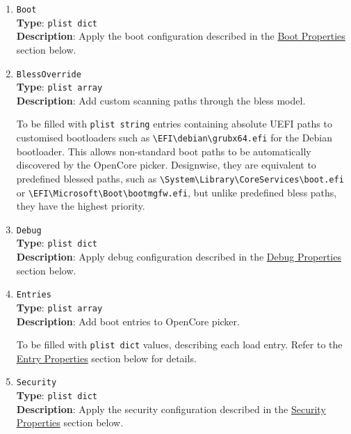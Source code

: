 \documentclass[]{article}
\begin{document}
\begin{enumerate}
\item
  \texttt{Boot}\\
  \textbf{Type}: \texttt{plist\ dict}\\
  \textbf{Description}: Apply the boot configuration described in the
  \hyperref[miscbootprops]{Boot Properties} section below.

\item
  \texttt{BlessOverride}\\
  \textbf{Type}: \texttt{plist\ array}\\
  \textbf{Description}: Add custom scanning paths through the bless model.

  To be filled with \texttt{plist\ string} entries containing
  absolute UEFI paths to customised bootloaders such as
  \texttt{\textbackslash EFI\textbackslash debian\textbackslash grubx64.efi}
  for the Debian bootloader. This allows non-standard boot paths to be automatically
  discovered by the OpenCore picker. Designwise, they are equivalent to predefined blessed paths, such as
  \texttt{\textbackslash System\textbackslash Library\textbackslash CoreServices\textbackslash boot.efi}
  or \texttt{\textbackslash EFI\textbackslash Microsoft\textbackslash Boot\textbackslash bootmgfw.efi},
  but unlike predefined bless paths, they have the highest priority.

\item
  \texttt{Debug}\\
  \textbf{Type}: \texttt{plist\ dict}\\
  \textbf{Description}: Apply debug configuration described in the
  \hyperref[miscdebugprops]{Debug Properties} section below.

\item
  \texttt{Entries}\\
  \textbf{Type}: \texttt{plist\ array}\\
  \textbf{Description}: Add boot entries to OpenCore picker.

  To be filled with \texttt{plist\ dict} values, describing each load entry.
  Refer to the \hyperref[miscentryprops]{Entry Properties} section below for details.

\item
  \texttt{Security}\\
  \textbf{Type}: \texttt{plist\ dict}\\
  \textbf{Description}: Apply the security configuration described in the
  \hyperref[miscsecurityprops]{Security Properties} section below.


\end{enumerate}
\end{document}
